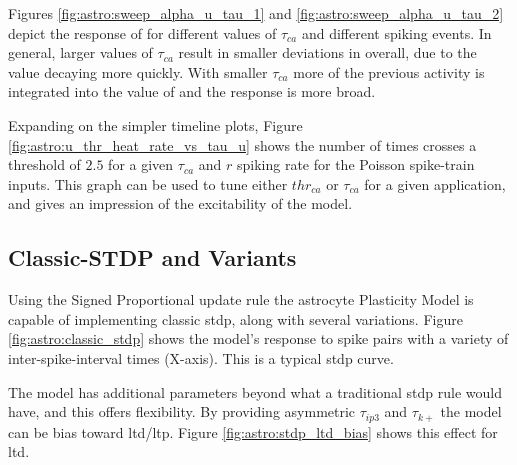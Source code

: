 

Figures \ref{fig:astro:sweep_alpha_u_tau_1} and
\ref{fig:astro:sweep_alpha_u_tau_2} depict the response of \ca for
different values of $\tau_{ca}$ and different spiking events. In general,
larger values of $\tau_{ca}$ result in smaller deviations in \ca overall, due
to the value decaying more quickly. With smaller $\tau_{ca}$ more of the
previous activity is integrated into the value of \ca and the response is
more broad.

Expanding on the simpler timeline plots, Figure
\ref{fig:astro:u_thr_heat_rate_vs_tau_u} shows the number of times \ca crosses a
threshold of $2.5$ for a given $\tau_{ca}$ and $r$ spiking rate for the Poisson
spike-train inputs. This graph can be used to tune either $thr_{ca}$ or $\tau_{ca}$
for a given application, and gives an impression of the excitability of the
model.


\subsection{Classic-STDP and Variants} \label{sec:ordered_prop:stdp}

Using the Signed Proportional update rule the astrocyte Plasticity Model is
capable of implementing classic \gls{stdp}, along with several variations. Figure
\ref{fig:astro:classic_stdp} shows the model's response to spike pairs with
a variety of inter-spike-interval times (X-axis). This is a typical \gls{stdp}
curve.


The model has additional parameters beyond what a traditional \gls{stdp} rule
would have, and this offers flexibility. By providing asymmetric
$\tau_{ip3}$ and $\tau_{k+}$ the model can be bias toward \gls{ltd}/\gls{ltp}. Figure
\ref{fig:astro:stdp_ltd_bias} shows this effect for \gls{ltd}.

